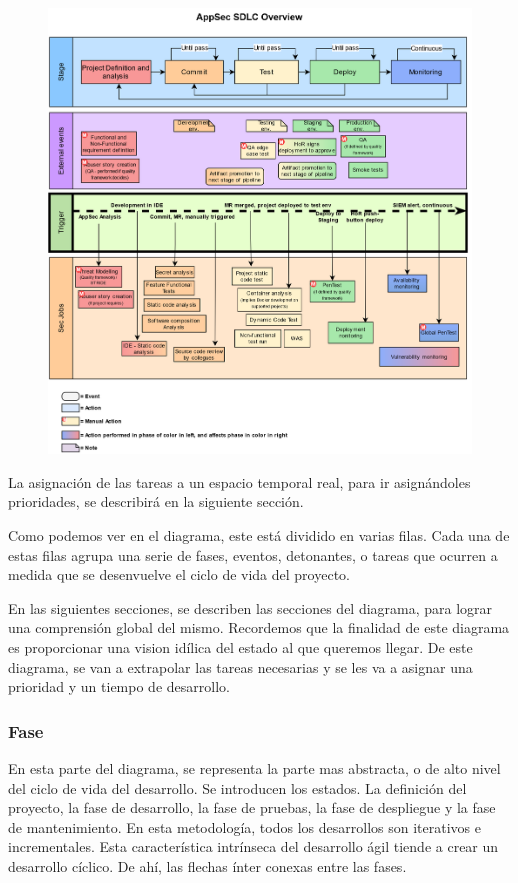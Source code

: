 \documentclass[12pt]{report} %
\begin{document}
\begin{figure}[H] \includegraphics[width=\textwidth]{SDLC-Sec} \end{figure}

La asignación de las tareas a un espacio temporal real, para ir asignándoles
prioridades, se describirá en la siguiente sección.

Como podemos ver en el diagrama, este está dividido en varias filas.
Cada una de estas filas agrupa una serie de fases, eventos, detonantes, o tareas
que ocurren a medida que se desenvuelve el ciclo de vida del proyecto.

En las siguientes secciones, se describen las secciones del diagrama, para lograr
una comprensión global del mismo.
Recordemos que la finalidad de este diagrama es proporcionar una vision idílica
del estado al que queremos llegar.
De este diagrama, se van a extrapolar las tareas necesarias y se les va a
asignar una prioridad y un tiempo de desarrollo. 

\subsubsection{Fase} 

En esta parte del diagrama, se representa la parte mas abstracta, o de alto
nivel del ciclo de vida del desarrollo.
Se introducen los estados.
La definición del proyecto, la fase de desarrollo, la fase de pruebas, la fase
de despliegue y la fase de mantenimiento.
En esta metodología, todos los desarrollos son iterativos e incrementales.
Esta característica intrínseca del desarrollo ágil tiende a crear un 
desarrollo cíclico.
De ahí, las flechas ínter conexas entre las fases.
\end{document}
